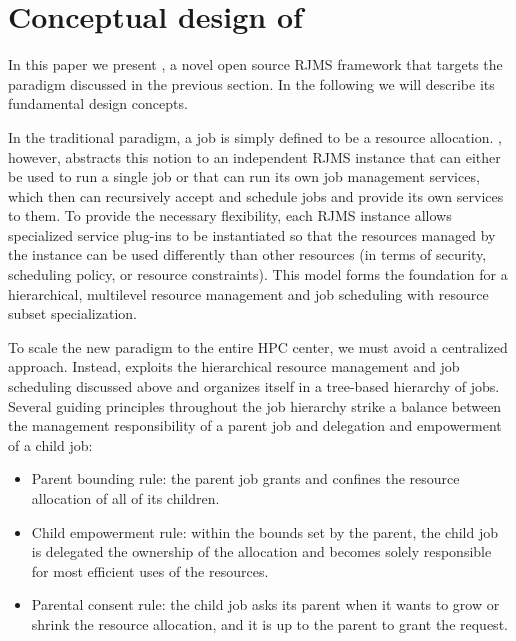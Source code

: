 \section{Conceptual design of \flux}
\label{models}

In this paper we present \flux, a novel open source RJMS framework that
targets the paradigm discussed in the previous section. In the following
we will describe its
%
fundamental design
concepts.

\vspace{1ex}
 In the traditional paradigm, 
a job is simply defined to be a resource allocation. 
\flux, however, abstracts this notion to an independent 
RJMS instance that can either be used to run a single job
or that can 
run its own job management services,
which then can recursively accept and schedule jobs and provide its own 
services to them. To provide the necessary flexibility,
each RJMS instance 
allows specialized service
plug-ins to be instantiated so that the resources managed by the instance
can be used differently than other resources (in terms of security, scheduling policy, or resource constraints).
This model forms 
the foundation for a hierarchical,
multilevel resource management and job scheduling
with resource subset specialization.

\vspace{1ex}
 To scale the new paradigm 
to the entire HPC center, we must avoid a centralized approach. 
Instead, \flux exploits the hierarchical resource management 
and job scheduling discussed above and organizes itself in a tree-based hierarchy of \flux jobs. 
Several guiding principles throughout the job hierarchy strike 
a balance between the management responsibility 
of a parent job and delegation and empowerment of a child job:

\begin{itemize}
\item{Parent bounding rule: the parent job grants 
and confines the resource allocation of all of its children.}

\item{Child empowerment rule: within the bounds set 
by the parent, the child job is delegated the ownership 
of the allocation and becomes solely responsible 
for most efficient uses of the resources.}

\item{Parental consent rule: the child job asks 
its parent when it wants to grow or shrink the resource 
allocation, and it is up to the parent to grant the request.}
\end{itemize}

